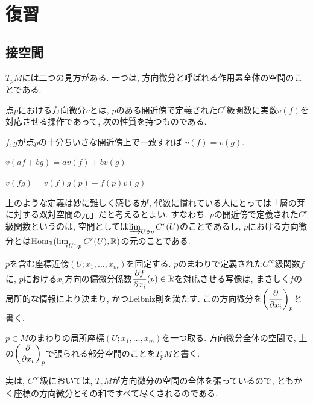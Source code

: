 \section{復習}
\subsection{接空間}
$T_p M$には二つの見方がある. 一つは, 方向微分と呼ばれる作用素全体の空間のことである.
\begin{defn}
点$p$における方向微分$v$とは, $p$のある開近傍で定義された$C^r$級関数に実数$v(f)$を対応させる操作であって, 次の性質を持つものである.
\ben
\item $f,g$が点$p$の十分ちいさな開近傍上で一致すれば $v(f) = v(g)$.
\item $v(af + bg) = a v(f) + bv(g)$
\item $v(fg) = v(f)g(p) + f(p) v(g)$
\een
\end{defn}

\begin{rem}
上のような定義は妙に難しく感じるが, 代数に慣れている人にとっては「層の芽に対する双対空間の元」だと考えるとよい. すなわち, $p$の開近傍で定義された$C^r$級関数というのは, 空間としては$ \varinjlim_{U\ni p} C^r(U)$のことであるし,  $p$における方向微分とは$\mathrm{Hom}_{\mathbb{R}}(\varinjlim_{U\ni p} C^r(U) ,\mathbb{R})$の元のことである.
\end{rem}

\begin{eg} $p$を含む座標近傍$(U;x_1,\dots,x_m)$を固定する. $p$のまわりで定義された$C^{\infty}$級関数$f$に, $p$における$x_i$方向の偏微分係数$\dfrac{\partial f}{\partial x_i}(p) \in \mathbb{R}$を対応させる写像は, まさしく$f$の局所的な情報により決まり, かつLeibniz則を満たす. この方向微分を$\left( \dfrac{\partial}{\partial x_i} \right)_{p}$と書く.
\end{eg}


\begin{defn}
$p\in M$のまわりの局所座標$(U;x_1,\dots, x_m)$を一つ取る. 方向微分全体の空間で, 上の$\left( \dfrac{\partial}{\partial x_i} \right)_{p}$で張られる部分空間のことを$T_pM$と書く.
\end{defn}

\begin{rem}
実は, $C^{\infty}$級においては, $T_pM$が方向微分の空間の全体を張っているので, ともかく座標の方向微分とその和ですべて尽くされるのである.
\end{rem}

